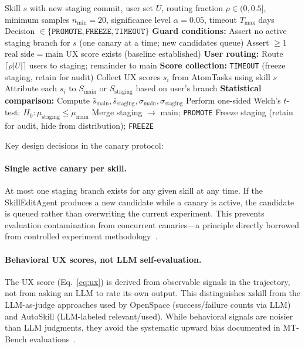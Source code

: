 \documentclass{article}
\begin{document}
\begin{algorithm}[t]
\caption{Canary Evaluation Protocol}
\label{alg:canary}
\begin{algorithmic}[1]
\REQUIRE Skill $s$ with new staging commit, user set $U$, routing fraction $\rho \in (0, 0.5]$, minimum samples $n_{\min} = 20$, significance level $\alpha = 0.05$, timeout $T_{\max}$ days
\ENSURE Decision $\in \{\texttt{PROMOTE}, \texttt{FREEZE}, \texttt{TIMEOUT}\}$
\STATE \textbf{Guard conditions:}
\STATE \quad Assert no active staging branch for $s$ (one canary at a time; new candidates queue)
\STATE \quad Assert $\geq 1$ real $\mathrm{side}=\mathrm{main}$ UX score exists (baseline established)
\STATE
\STATE \textbf{User routing:}
\STATE Route $\lceil \rho |U| \rceil$ users to staging; remainder to main
\STATE
\STATE \textbf{Score collection:}
        \RETURN \texttt{TIMEOUT} (freeze staging, retain for audit)
    \ENDIF
    \STATE Collect UX scores $s_i$ from AtomTasks using skill $s$
    \STATE Attribute each $s_i$ to $S_{\mathrm{main}}$ or $S_{\mathrm{staging}}$ based on user's branch
\ENDWHILE
\STATE
\STATE \textbf{Statistical comparison:}
\STATE Compute $\bar{s}_{\mathrm{main}}, \bar{s}_{\mathrm{staging}}, \sigma_{\mathrm{main}}, \sigma_{\mathrm{staging}}$
\STATE Perform one-sided Welch's $t$-test: $H_0\!: \mu_{\mathrm{staging}} \leq \mu_{\mathrm{main}}$
    \STATE Merge staging $\to$ main; \RETURN \texttt{PROMOTE}
\ELSE
    \STATE Freeze staging (retain for audit, hide from distribution); \RETURN \texttt{FREEZE}
\ENDIF
\end{algorithmic}
\end{algorithm}

Key design decisions in the canary protocol:

\paragraph{Single active canary per skill.} At most one staging branch exists for any given skill at any time. If the SkillEditAgent produces a new candidate while a canary is active, the candidate is queued rather than overwriting the current experiment. This prevents evaluation contamination from concurrent canaries---a principle directly borrowed from controlled experiment methodology~\citep{kohavi2020trustworthy}.

\paragraph{Behavioral UX scores, not LLM self-evaluation.} The UX score (Eq.~\ref{eq:ux}) is derived from observable signals in the trajectory, not from asking an LLM to rate its own output. This distinguishes xskill from the LLM-as-judge approaches used by OpenSpace (success/failure counts via LLM) and AutoSkill (LLM-labeled relevant/used). While behavioral signals are noisier than LLM judgments, they avoid the systematic upward bias documented in MT-Bench evaluations~\citep{zheng2024judging}.
\end{document}
